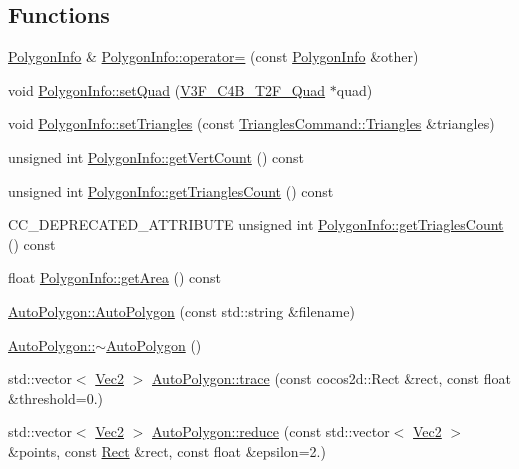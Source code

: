 \subsection*{Functions}
\begin{DoxyCompactItemize}
\item 
\hyperlink{classPolygonInfo}{Polygon\+Info} \& \hyperlink{group____2d_ga93a62a7d94006f7a4cb05e8471486200}{Polygon\+Info\+::operator=} (const \hyperlink{classPolygonInfo}{Polygon\+Info} \&other)
\item 
void \hyperlink{group____2d_ga119fbf0478829130e57de44eeddb37ea}{Polygon\+Info\+::set\+Quad} (\hyperlink{structV3F__C4B__T2F__Quad}{V3\+F\+\_\+\+C4\+B\+\_\+\+T2\+F\+\_\+\+Quad} $\ast$quad)
\item 
void \hyperlink{group____2d_ga0fd028d854bdb30347161b5d816743a4}{Polygon\+Info\+::set\+Triangles} (const \hyperlink{structTrianglesCommand_1_1Triangles}{Triangles\+Command\+::\+Triangles} \&triangles)
\item 
unsigned int \hyperlink{group____2d_ga266fe3f8a962c0281b381ad1a55835bd}{Polygon\+Info\+::get\+Vert\+Count} () const
\item 
unsigned int \hyperlink{group____2d_ga0ca8e8c33d34a16c1f8cf33d13aeea2b}{Polygon\+Info\+::get\+Triangles\+Count} () const
\item 
C\+C\+\_\+\+D\+E\+P\+R\+E\+C\+A\+T\+E\+D\+\_\+\+A\+T\+T\+R\+I\+B\+U\+TE unsigned int \hyperlink{group____2d_ga29950bcfeaeaa13bca256166562caabc}{Polygon\+Info\+::get\+Triagles\+Count} () const
\item 
float \hyperlink{group____2d_gae6fa5ff93a6637153aa41a755486c21b}{Polygon\+Info\+::get\+Area} () const
\item 
\hyperlink{group____2d_gaa74351ac8f735344958e7b2ac8363bb5}{Auto\+Polygon\+::\+Auto\+Polygon} (const std\+::string \&filename)
\item 
\hyperlink{group____2d_gaca856dfbfddcb64d3fa29bf261dd10f8}{Auto\+Polygon\+::$\sim$\+Auto\+Polygon} ()
\item 
std\+::vector$<$ \hyperlink{classVec2}{Vec2} $>$ \hyperlink{group____2d_gad9ffba6df684ed89dbed2173e66f2969}{Auto\+Polygon\+::trace} (const cocos2d\+::\+Rect \&rect, const float \&threshold=0.)
\item 
std\+::vector$<$ \hyperlink{classVec2}{Vec2} $>$ \hyperlink{group____2d_ga21c47c22ffc43bb0157be9b3be01f56b}{Auto\+Polygon\+::reduce} (const std\+::vector$<$ \hyperlink{classVec2}{Vec2} $>$ \&points, const \hyperlink{classRect}{Rect} \&rect, const float \&epsilon=2.)
\item 

\end{DoxyCompactItemize}
